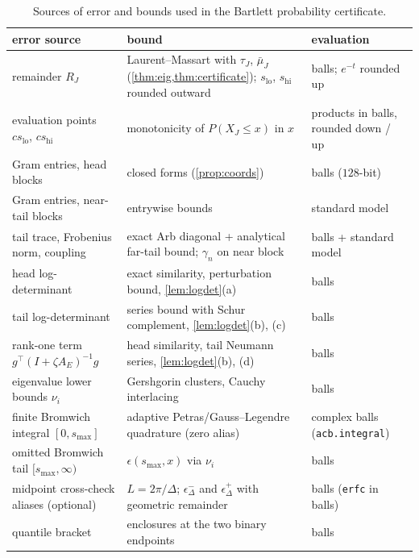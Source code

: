 \begin{table}[tbp]\centering\footnotesize
\caption{Sources of error and bounds used in the Bartlett probability certificate.}\label{tab:errsources}
\begin{tabular}{@{}>{\raggedright}p{}>{\raggedright}p{}>{\raggedright\arraybackslash}p{}@{}}\toprule
error source & bound & evaluation\\\midrule
remainder $R_J$ & Laurent--Massart with $\tau_J$, $\bar\mu_J$ (\cref{thm:eig,thm:certificate}); $s_{\mathrm{lo}}$, $s_{\mathrm{hi}}$ rounded outward & balls; $e^{-t}$ rounded up\\
evaluation points $cs_{\mathrm{lo}}$, $cs_{\mathrm{hi}}$ & monotonicity of $P(X_J\le x)$ in $x$ & products in balls, rounded down / up\\
Gram entries, head blocks & closed forms (\cref{prop:coords}) & balls ($128$-bit)\\
Gram entries, near-tail blocks & entrywise bounds & standard model\\
tail trace, Frobenius norm, coupling & exact Arb diagonal + analytical far-tail bound; $\gamma_n$ on near block & balls + standard model\\
head log-determinant & exact similarity, perturbation bound, \cref{lem:logdet}(a) & balls\\
tail log-determinant & series bound with Schur complement, \cref{lem:logdet}(b), (c) & balls\\
rank-one term $g^\top(I+\zeta A_E)^{-1}g$ & head similarity, tail Neumann series, \cref{lem:logdet}(b), (d) & balls\\
eigenvalue lower bounds $\nu_i$ & Gershgorin clusters, Cauchy interlacing & balls\\
finite Bromwich integral $[0,s_{\max}]$ & adaptive Petras/Gauss--Legendre quadrature \citep{Joh18} (zero alias) & complex balls (\texttt{acb.integral})\\
omitted Bromwich tail $[s_{\max},\infty)$ & $\epsilon(s_{\max},x)$ via $\nu_i$ & balls\\
midpoint cross-check aliases (optional) & $L=2\pi/\Delta$; $\epsilon_\Delta^-$ and $\epsilon_\Delta^+$ with geometric remainder & balls (\texttt{erfc} in balls)\\
quantile bracket & enclosures at the two binary endpoints & balls\\\bottomrule
\end{tabular}
\end{table}

